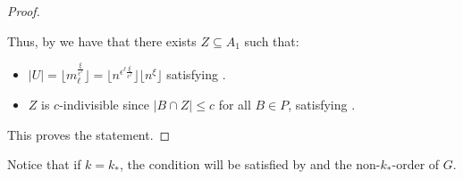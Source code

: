 \begin{lemma}[Claim 4.21]
\begin{proof}
\begin{itemize}
            \end{itemize}
            Thus, by  we have that there exists $Z \subseteq A_1$ such that:
            \begin{itemize}
                \item $|U| = \lfloor m_\ell^{\frac{\xi}{\epsilon^\ell}} \rfloor = \lfloor n^{\epsilon^\ell \frac{\xi}{\epsilon^\ell}} \rfloor
                    \lfloor n^\xi \rfloor$ satisfying .
                \item $Z$ is $c$-indivisible since $|B \cap Z| \leq c$ for all $B \in P$,
                    satisfying .
            \end{itemize}
            This proves the statement.
        \end{proof}
    \end{lemma}

    \begin{remark}[Remark 4.22] \label{rmk:k_asterisk_enough_for_k}
        Notice that if $k = k_*$, the condition  will be satisfied by 
        and the non-$k_*$-order of $G$.
    \end{remark}

